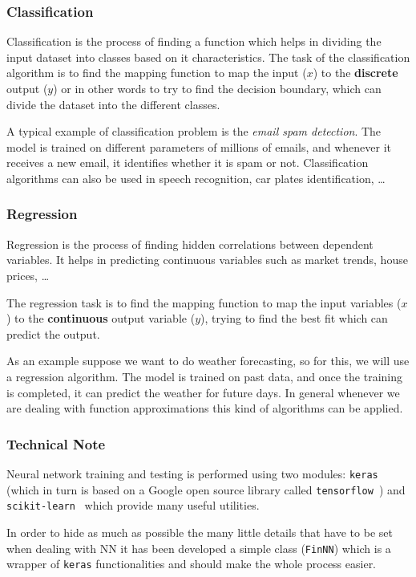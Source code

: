 \subsubsection{Classification}
\label{classification}

Classification is the process of finding a function which helps in dividing the input dataset into classes based on it characteristics. 
The task of the classification algorithm is to find the mapping function to map the input (\(x\)) to the \textbf{discrete} output (\(y\)) or in other words to try to find the decision boundary, which can divide the dataset into the different classes.

A typical example of classification problem is the \emph{email spam detection}. The model is trained on different parameters of millions of emails, and whenever it receives a new email, it identifies whether it is spam or not. Classification algorithms can also be used in speech recognition, car plates identification, \ldots

\subsubsection{Regression}
\label{regression}

Regression is the process of finding hidden correlations between dependent variables. It helps in predicting continuous variables such as market trends, house prices, \ldots

The regression task is to find the mapping function to map the input variables (\(x\)) to the \textbf{continuous} output variable (\(y\)), trying to find the best fit which can predict the output.

As an example suppose we want to do weather forecasting, so for this, we will use a regression algorithm. The model is trained on past data, and once the training is completed, it can predict the weather for future days. In general whenever we are dealing with function approximations this kind of algorithms can be applied.

\begin{attention}
\subsubsection{Technical Note}\label{technical-note}

Neural network training and testing is performed using two modules: \texttt{keras}~\cite{bib:keras} (which in turn is based on a Google open source library called \texttt{tensorflow}~\cite{bib:tensorflow}) and \texttt{scikit-learn}~\cite{bib:scikit} which provide many useful utilities.

In order to hide as much as possible the many little details that have to be set when dealing with NN it has been developed a simple class (\texttt{FinNN}) which is a wrapper of \texttt{keras} functionalities and should make the whole process easier.
\end{attention}


